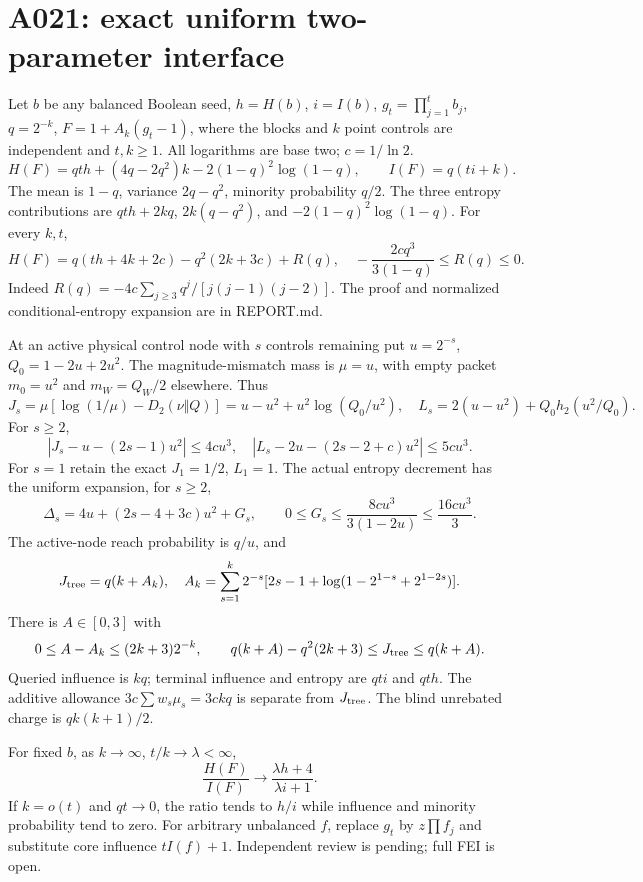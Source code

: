 \documentclass{article}
\begin{document}
\section*{A021: exact uniform two-parameter interface}
Let $b$ be any balanced Boolean seed, $h=H(b)$, $i=I(b)$,
$g_t=\prod_{j=1}^t b_j$, $q=2^{-k}$, $F=1+A_k(g_t-1)$,
where the blocks and $k$ point controls are independent and $t,k\ge1$.
All logarithms are base two; $c=1/\ln2$.
\[
 H(F)=qth+(4q-2q^2)k-2(1-q)^2\log(1-q),\qquad
 I(F)=q(ti+k).
\]
The mean is $1-q$, variance $2q-q^2$, minority probability $q/2$.
The three entropy contributions are $qth+2kq$, $2k(q-q^2)$,
and $-2(1-q)^2\log(1-q)$.
For every $k,t$,
\[
 H(F)=q(th+4k+2c)-q^2(2k+3c)+R(q),\quad
 -\frac{2cq^3}{3(1-q)}\le R(q)\le0.
\]
Indeed $R(q)=-4c\sum_{j\ge3}q^j/[j(j-1)(j-2)]$.
The proof and normalized conditional-entropy expansion are in REPORT.md.

At an active physical control node with $s$ controls remaining put
$u=2^{-s}$, $Q_0=1-2u+2u^2$.
The magnitude-mismatch mass is $\mu=u$, with empty packet $m_0=u^2$
and $m_W=Q_W/2$ elsewhere. Thus
\[
 J_s=\mu[\log(1/\mu)-D_2(\nu\Vert Q)]
 =u-u^2+u^2\log(Q_0/u^2),
\quad L_s=2(u-u^2)+Q_0h_2(u^2/Q_0).
\]
For $s\ge2$,
\[
 |J_s-u-(2s-1)u^2|\le4cu^3,\quad
 |L_s-2u-(2s-2+c)u^2|\le5cu^3.
\]
For $s=1$ retain the exact $J_1=1/2$, $L_1=1$.
The actual entropy decrement has the uniform expansion, for $s\ge2$,
\[
 \Delta_s=4u+(2s-4+3c)u^2+G_s,\qquad
 0\le G_s\le\frac{8cu^3}{3(1-2u)}\le\frac{16cu^3}{3}.
\]
The active-node reach probability is $q/u$, and
\[
 J_{\rm tree}=q(k+A_k),\quad
 A_k=\sum_{s=1}^k2^{-s}[2s-1+\log(1-2^{1-s}+2^{1-2s})].
\]
There is $A\in[0,3]$ with
\[
 0\le A-A_k\le(2k+3)2^{-k},\qquad
 q(k+A)-q^2(2k+3)\le J_{\rm tree}\le q(k+A).
\]
Queried influence is $kq$; terminal influence and entropy are $qti$ and $qth$.
The additive allowance $3c\sum w_s\mu_s=3ckq$ is separate from $J_{\rm tree}$.
The blind unrebated charge is $qk(k+1)/2$.

For fixed $b$, as $k\to\infty$, $t/k\to\lambda<\infty$,
\[
 \frac{H(F)}{I(F)}\longrightarrow\frac{\lambda h+4}{\lambda i+1}.
\]
If $k=o(t)$ and $qt\to0$, the ratio tends to $h/i$ while influence and
minority probability tend to zero. For arbitrary unbalanced $f$, replace
$g_t$ by $z\prod f_j$ and substitute core influence $tI(f)+1$.
Independent review is pending; full FEI is open.
\end{document}
